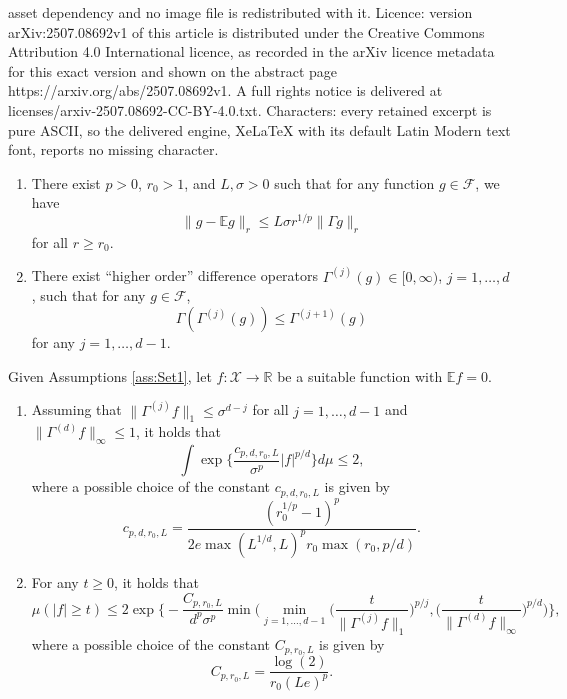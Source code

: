 \documentclass[10pt,a4paper]{amsart}
\def\E{{\mathbb E}}
\def\R{{\mathbb R}}
\begin{document}
asset dependency and no image file is redistributed with it. Licence: version arXiv:2507.08692v1 of this article is distributed under the Creative Commons Attribution 4.0 International licence, as recorded in the arXiv licence metadata for this exact version and shown on the abstract page https://arxiv.org/abs/2507.08692v1. A full rights notice is delivered at licenses/arxiv-2507.08692-CC-BY-4.0.txt. Characters: every retained excerpt is pure ASCII, so the delivered engine, XeLaTeX with its default Latin Modern text font, reports no missing character.
\begin{assumptions}\label{ass:Set1}
\begin{enumerate}
\item There exist $p > 0$, $r_0 > 1$, and $L, \sigma > 0$ such that for any function $g \in \mathcal{F}$, we have
\begin{equation*}
	\lVert g - \E g \rVert_r \le L\sigma r^{1/p} \lVert \Gamma g \rVert_r
\end{equation*}
for all $r \ge r_0$.
\item There exist ``higher order'' difference operators $\Gamma^{(j)}(g) \in [0,\infty)$, $j = 1, \ldots, d$, such that for any $g \in \mathcal{F}$,
\begin{equation*}
	\Gamma (\Gamma^{(j)}(g)) \le \Gamma^{(j+1)}(g)
\end{equation*}
for any $j = 1, \ldots, d-1$.
\end{enumerate}
\end{assumptions}

\begin{satz}\label{thm:HigherOrder}
    Given Assumptions \ref{ass:Set1}, let $f\colon \mathcal{X} \to \R$ be a suitable function with $\E f = 0$.
    \begin{enumerate}
        \item Assuming that $\lVert \Gamma^{(j)} f \rVert_1 \le \sigma^{d-j}$ for all $j=1,\ldots,d-1$ and $\lVert \Gamma^{(d)} f \rVert_\infty \le 1$, it holds that
        \[
        \int \exp\Big\{\frac{c_{p,d,r_0,L}}{\sigma^p} |f|^{p/d} \Big\} d\mu \le 2,
        \]
        where a possible choice of the constant $c_{p,d,r_0,L}$ is given by
        \[
        c_{p,d,r_0,L} = \frac{(r_0^{1/p}-1)^p}{2e\max(L^{1/d}, L)^pr_0\max(r_0,p/d)}.
        \]
        \item For any $t\ge 0$, it holds that
        \[
        \mu(|f| \ge t)\le
        2 \exp\Big\{- \frac{C_{p,r_0,L}}{d^p\sigma^p} \min\Big(\min_{j=1, \ldots,d-1} \Big(\frac{t}{\lVert \Gamma^{(j)} f \rVert_1}\Big)^{p/j}, \Big(\frac{t}{\lVert \Gamma^{(d)} f \rVert_\infty}\Big)^{p/d}\Big)\Big\},
        \]
    where a possible choice of the constant $C_{p,r_0,L}$ is given by
    \[
    C_{p,r_0,L} = \frac{\log(2)}{r_0(Le)^p}.
    \]
    \end{enumerate}
\end{satz}
\end{document}
